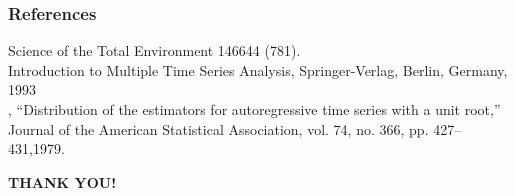\documentclass[11pt]{beamer}
\begin{document}
\begin{frame}
	\frametitle{References}
	\begin{thebibliography}{9}
		 Science of the Total Environment 146644 (781).\\
		  Introduction to Multiple Time Series Analysis, Springer-Verlag, Berlin, Germany, 1993\\
		, “Distribution of the estimators for autoregressive time series with a unit root,” Journal of the American Statistical Association, vol. 74, no. 366, pp. 427–431,1979.
	\end{thebibliography}
\end{frame}
\begin{frame}{}
	\begin{center}
		\Large\textbf{THANK YOU!}
	\end{center}
\end{frame}
\end{document}
